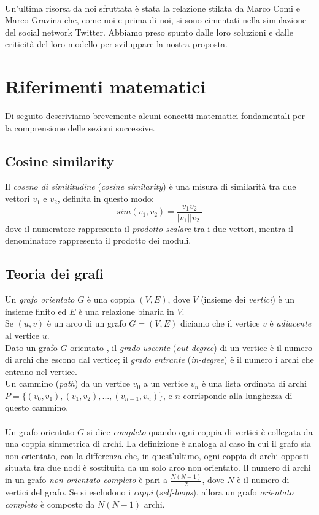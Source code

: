 \documentclass[a4paper,12pt]{article}
\begin{document}
\\
Un'ultima risorsa da noi sfruttata è stata la relazione stilata da Marco Comi e Marco Gravina che, come noi e prima di noi, si sono cimentati nella simulazione del social network Twitter. Abbiamo preso spunto dalle loro soluzioni e dalle criticità del loro modello per sviluppare la nostra proposta.
\section{Riferimenti matematici}
Di seguito descriviamo brevemente alcuni concetti matematici fondamentali per la comprensione delle sezioni successive.
\label{sec:mat}
\subsection{Cosine similarity}
\label{subsec:cos}
Il \textit{coseno di similitudine} (\textit{cosine similarity}) \cite{ir} è una misura di similarità tra due vettori $v_1$ e $v_2$, definita in questo modo:
\begin{equation}
sim(v_1,v_2) = \dfrac{v_1v_2}{|v_1||v_2|}
\end{equation}
dove il numeratore rappresenta il \textit{prodotto scalare} tra i due vettori, mentra il denominatore rappresenta il prodotto dei moduli.
\subsection{Teoria dei grafi}
\label{subsec:graph}
Un \textit{grafo orientato} $G$ \cite{cormen} è una coppia $(V,E)$, dove $V$ (insieme dei \textit{vertici}) è un insieme finito ed $E$ è una relazione binaria in $V$.\\
Se $(u,v)$ è un arco \cite{cormen} di un grafo $G = (V,E)$ diciamo che il vertice $v$ è \textit{adiacente} al vertice $u$.\\
Dato un grafo $G$ orientato \cite{cormen}, il \textit{grado uscente} (\textit{out-degree}) di un vertice è il numero di archi che escono dal vertice; il \textit{grado entrante} (\textit{in-degree}) è il numero i archi che entrano nel vertice. \\
Un cammino (\textit{path}) \cite{barabasi} da un vertice $v_0$ a un vertice $v_n$ è una lista ordinata di archi $P = \{(v_0,v_1),(v_1,v_2),...,(v_{n-1},v_n)\}$, e $n$ corrisponde alla lunghezza di questo cammino. \\
\\
Un grafo orientato $G$ si dice \textit{completo} \cite{barabasi} quando ogni coppia di vertici è collegata da una coppia simmetrica di archi. La definizione è analoga al caso in cui il grafo sia non orientato, con la differenza che, in quest'ultimo, ogni coppia di archi opposti situata tra due nodi è sostituita da un solo arco non orientato. Il numero di archi \cite{barabasi} in un grafo \textit{non orientato completo} è pari a $\tfrac{N(N-1)}{2}$, dove $N$ è il numero di vertici del grafo. Se si escludono i \textit{cappi} (\textit{self-loops}), allora un grafo \textit{orientato completo} è composto da $N(N-1)$ archi. 
\end{document}
